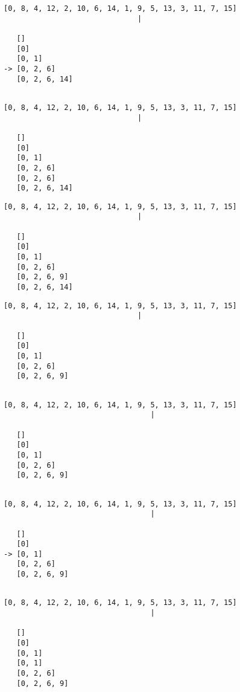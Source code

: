{ \begin{verbatim}
[0, 8, 4, 12, 2, 10, 6, 14, 1, 9, 5, 13, 3, 11, 7, 15]
                               |

   []
   [0]
   [0, 1]
-> [0, 2, 6]
   [0, 2, 6, 14]


\end{verbatim} }

{ \begin{verbatim}
[0, 8, 4, 12, 2, 10, 6, 14, 1, 9, 5, 13, 3, 11, 7, 15]
                               |

   []
   [0]
   [0, 1]
   [0, 2, 6]
   [0, 2, 6]
   [0, 2, 6, 14]

\end{verbatim} }

{ \begin{verbatim}
[0, 8, 4, 12, 2, 10, 6, 14, 1, 9, 5, 13, 3, 11, 7, 15]
                               |

   []
   [0]
   [0, 1]
   [0, 2, 6]
   [0, 2, 6, 9]
   [0, 2, 6, 14]

\end{verbatim} }

{ \begin{verbatim}
[0, 8, 4, 12, 2, 10, 6, 14, 1, 9, 5, 13, 3, 11, 7, 15]
                               |

   []
   [0]
   [0, 1]
   [0, 2, 6]
   [0, 2, 6, 9]


\end{verbatim} }

{ \begin{verbatim}
[0, 8, 4, 12, 2, 10, 6, 14, 1, 9, 5, 13, 3, 11, 7, 15]
                                  |

   []
   [0]
   [0, 1]
   [0, 2, 6]
   [0, 2, 6, 9]


\end{verbatim} }

{ \begin{verbatim}
[0, 8, 4, 12, 2, 10, 6, 14, 1, 9, 5, 13, 3, 11, 7, 15]
                                  |

   []
   [0]
-> [0, 1]
   [0, 2, 6]
   [0, 2, 6, 9]


\end{verbatim} }

{ \begin{verbatim}
[0, 8, 4, 12, 2, 10, 6, 14, 1, 9, 5, 13, 3, 11, 7, 15]
                                  |

   []
   [0]
   [0, 1]
   [0, 1]
   [0, 2, 6]
   [0, 2, 6, 9]

\end{verbatim} }

